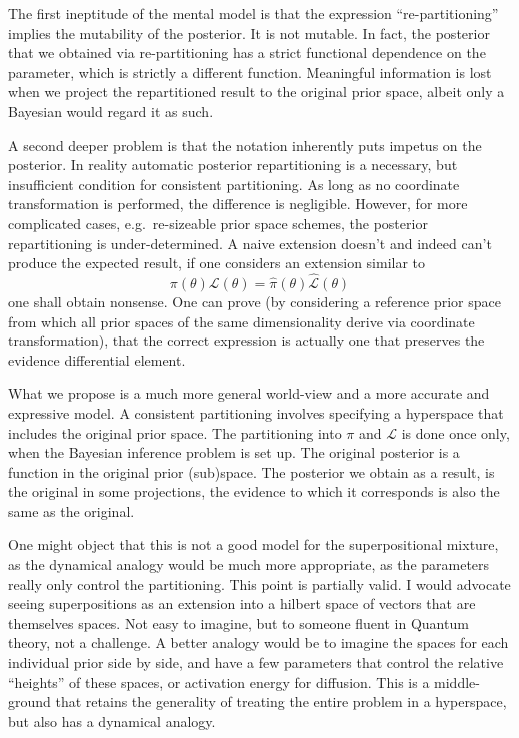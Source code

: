 \documentclass[usenatbib]{mnras}
\begin{document}
The first ineptitude of the mental model is that the expression
``re-partitioning'' implies the mutability of the posterior. It is not
mutable. In fact, the posterior that we obtained via re-partitioning
has a strict functional dependence on the parameter, which is strictly
a different function. Meaningful information is lost when we project
the repartitioned result to the original prior space, albeit only a
Bayesian would regard it as such.

A second deeper problem is that the notation inherently puts impetus
on the posterior. In reality automatic posterior repartitioning is a
necessary, but insufficient condition for consistent partitioning. As
long as no coordinate transformation is performed, the difference is
negligible. However, for more complicated cases, e.g.~re-sizeable
prior space schemes, the posterior repartitioning is
under-determined. A naive extension doesn't and indeed can't produce
the expected result, if one considers an extension similar to
\begin{equation}
  \label{eq:naive-extension}
\pi(\theta) \mathcal{L}(\theta) = \hat{\pi}(\theta) \mathcal{\hat{L}}(\theta) 
\end{equation}
one shall obtain nonsense. One can prove (by considering a reference
prior space from which all prior spaces of the same dimensionality
derive via coordinate transformation), that the correct expression is
actually one that preserves the evidence differential element.

What we propose is a much more general world-view and a more accurate
and expressive model. A consistent partitioning involves specifying a
hyperspace that includes the original prior space. The partitioning
into $\pi$ and $\mathcal{L}$ is done once only, when the Bayesian
inference problem is set up. The original posterior is a function in
the original prior (sub)space. The posterior we obtain as a result, is
the original in some projections, the evidence to which it corresponds
is also the same as the original.

One might object that this is not a good model for the superpositional
mixture, as the dynamical analogy would be much more appropriate, as
the parameters really only control the partitioning. This point is
partially valid. I would advocate seeing superpositions as an
extension into a hilbert space of vectors that are themselves
spaces. Not easy to imagine, but to someone fluent in Quantum theory,
not a challenge. A better analogy would be to imagine the spaces for
each individual prior side by side, and have a few parameters that
control the relative ``heights'' of these spaces, or activation energy
for diffusion. This is a middle-ground that retains the generality of
treating the entire problem in a hyperspace, but also has a dynamical
analogy.
\end{document}
